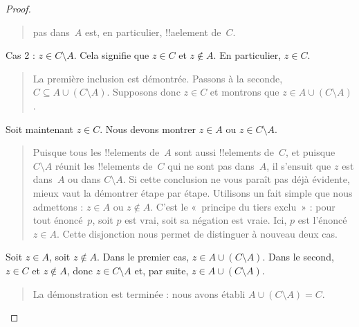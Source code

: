 \documentclass[../../../include/open-logic-section]{subfiles}
\begin{document}
\begin{proof}
\begin{quote}
    pas dans~$A$ est, en particulier,
    !!a{element} de~$C$.
  \end{quote}
  Cas 2 : $z \in C \setminus A$. Cela
  signifie que $z \in C$ et
  $z \notin A$. En particulier,
  $z \in C$.
  \begin{quote}
    La première inclusion est démontrée.
    Passons à la seconde,
    $C \subseteq A \cup (C \setminus A)$.
    Supposons donc $z \in C$ et montrons
    que $z \in A \cup (C \setminus A)$.
  \end{quote}
  Soit maintenant $z \in C$. Nous
  devons montrer $z \in A$ ou
  $z \in C \setminus A$.
  \begin{quote}
    Puisque tous les !!{element}s de~$A$
    sont aussi !!{element}s de~$C$, et
    puisque $C \setminus A$ réunit les
    !!{element}s de~$C$ qui ne sont pas
    dans~$A$, il s'ensuit que $z$ est
    dans~$A$ ou dans $C \setminus A$.
    Si cette conclusion ne vous paraît
    pas déjà évidente, mieux vaut la
    démontrer étape par étape. Utilisons
    un fait simple que nous admettons :
    $z \in A$ ou $z \notin A$.
    C'est le «~principe du tiers exclu~» :
    pour tout énoncé~$p$, soit $p$ est
    vrai, soit sa négation est vraie.
    Ici, $p$ est l'énoncé $z \in A$.
    Cette disjonction nous permet de
    distinguer à nouveau deux cas.
  \end{quote}
  Soit $z \in A$, soit $z \notin A$.
  Dans le premier cas,
  $z \in A \cup (C \setminus A)$.
  Dans le second, $z \in C$ et
  $z \notin A$, donc
  $z \in C \setminus A$ et, par suite,
  $z \in A \cup (C \setminus A)$.
  \begin{quote}
    La démonstration est terminée :
    nous avons établi
    $A \cup (C \setminus A) = C$.
  \end{quote}
\end{proof}
\end{document}
